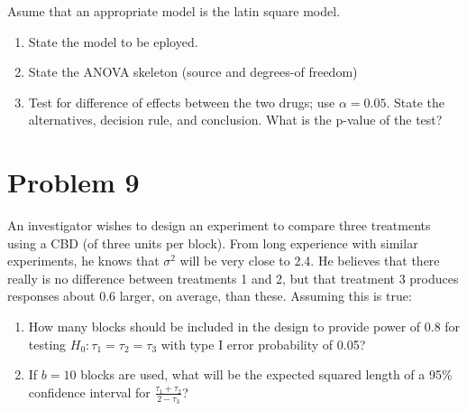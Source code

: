 \documentclass{article}
\begin{document}
Asume that an appropriate model is the latin square model.
\begin{enumerate}
	\item State the model to be eployed.
	\item State the ANOVA skeleton (source and degrees-of freedom)
	\item Test for difference of effects between the two drugs; use $\alpha =0.05$. State the alternatives,
	      decision rule, and conclusion. What is the p-value of the test?
\end{enumerate}

\section{Problem 9}
An investigator wishes to design an experiment to compare three treatments using a CBD (of three
units per block). From long experience with similar experiments, he knows that $\sigma^2$ will be very
close to 2.4. He believes that there really is no difference between treatments 1 and 2, but that
treatment 3 produces responses about 0.6 larger, on average, than these. Assuming this is true:

\begin{enumerate}
	\item How many blocks should be included in the design to provide power of 0.8 for testing
	      $H_0: \tau_1 = \tau_2 = \tau_3$ with type I error probability of 0.05?
	\item If $b=10$ blocks are used, what will be the expected squared length of a 95\% confidence interval
	      for $\frac{\tau_1 + \tau_2}{2-\tau_3}$?
\end{enumerate}
\end{document}
